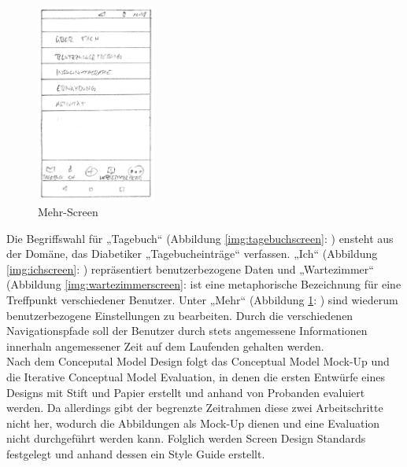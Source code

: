 \begin{figure}[H]
	\centering
	\includegraphics[width=0.35\textwidth]{images/mehrscreen.png}
	\captionsetup{justification=centering}
	\caption{Mehr-Screen}
	\label{img:mehrscreen}
\end{figure}
Die Begriffswahl für „Tagebuch“ (Abbildung \ref{img:tagebuchscreen}: ) ensteht aus der Domäne, das Diabetiker „Tagebucheinträge“ verfassen.  „Ich“ (Abbildung \ref{img:ichscreen}: ) repräsentiert benutzerbezogene Daten und „Wartezimmer“ (Abbildung \ref{img:wartezimmerscreen}:  ist eine metaphorische Bezeichnung für eine Treffpunkt verschiedener Benutzer. Unter „Mehr“ (Abbildung \ref{img:mehrscreen}: ) sind wiederum benutzerbezogene Einstellungen zu bearbeiten. Durch die verschiedenen Navigationspfade soll der Benutzer durch stets angemessene Informationen innerhaln angemessener Zeit auf dem Laufenden gehalten werden.\\
Nach dem Conceputal Model Design folgt das Conceptual Model Mock-Up und die Iterative Conceptual Model Evaluation, in denen die ersten Entwürfe eines Designs mit Stift und Papier erstellt  und anhand von Probanden evaluiert werden. Da allerdings gibt der begrenzte Zeitrahmen diese zwei Arbeitschritte nicht her, wodurch die Abbildungen als Mock-Up dienen und eine Evaluation nicht durchgeführt werden kann. Folglich werden Screen Design Standards festgelegt und anhand dessen ein Style Guide erstellt.

